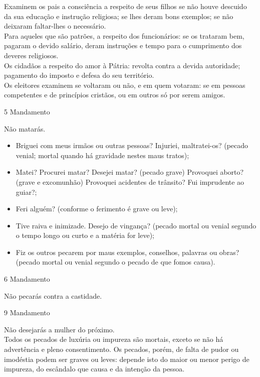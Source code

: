 \begin{flushleft}
    Examinem os pais a consciência a respeito de seus filhos se não houve descuido da sua educação e instrução religiosa; se lhes deram bons exemplos; se não deixaram faltar-lhes o necessário. \\
    Para aqueles que são patrões, a respeito dos funcionários: se os trataram bem, pagaram o devido salário, deram instruções e tempo para o cumprimento dos deveres religiosos. \\
    Os cidadãos a respeito do amor à Pátria: revolta contra a devida autoridade; pagamento do imposto e defesa do seu território.  \\
    Os eleitores examinem se voltaram ou não, e em quem votaram: se em pessoas competentes e de princípios cristãos, ou em outros só por serem amigos.
\end{flushleft}
\begin{center}
    5\textordmasculine{} Mandamento
\end{center}
\begin{flushleft}
    Não matarás.
\end{flushleft}
\begin{itemize}
    \item Briguei com meus irmãos ou outras pessoas? Injuriei, maltratei-os? (pecado venial; mortal quando há gravidade nestes maus tratos);
    \item Matei? Procurei matar? Desejei matar? (pecado grave) Provoquei aborto? (grave e excomunhão) Provoquei acidentes de trânsito? Fui imprudente ao guiar?;
    \item Feri alguém? (conforme o ferimento é grave ou leve);
    \item Tive raiva e inimizade. Desejo de vingança? (pecado mortal ou venial segundo o tempo longo ou curto e a matéria for leve);
    \item Fiz os outros pecarem por maus exemplos, conselhos, palavras ou obras? (pecado mortal ou venial segundo o pecado de que fomos causa).
\end{itemize}
\newpage
\begin{center}
    6\textordmasculine{} Mandamento
\end{center}
\begin{flushleft}
    Não pecarás contra a castidade.
\end{flushleft}
\begin{center}
    9\textordmasculine{} Mandamento
\end{center}
\begin{flushleft}
    Não desejarás a mulher do próximo. \\
    \hfill{} \break{}
    Todos os pecados de luxúria ou impureza são mortais, exceto se não há advertência e pleno consentimento. Os pecados, porém, de falta de pudor ou imodéstia podem ser graves ou leves: depende isto do maior ou menor perigo de impureza, do escândalo que causa e da intenção da pessoa.
\end{flushleft}

